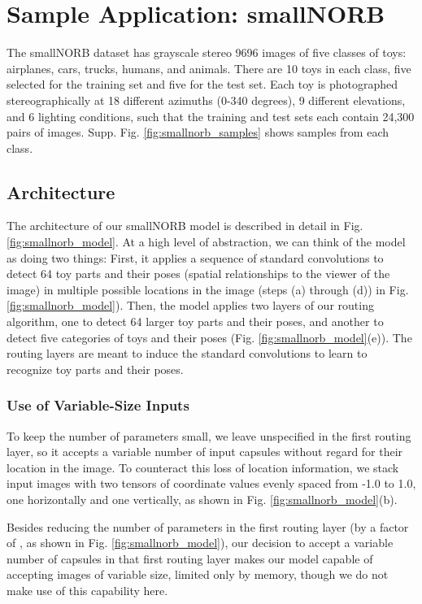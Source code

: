 \documentclass[11pt,a4paper]{article}
\begin{document}
\section{Sample Application: smallNORB}
\label{sec:smallNORB_discussion}

The smallNORB dataset \cite{LeCun:2004:LMG:1896300.1896315} has grayscale stereo 9696 images of five classes of toys: airplanes, cars, trucks, humans, and animals. There are 10 toys in each class, five selected for the training set and five for the test set. Each toy is photographed stereographically at 18 different azimuths (0-340 degrees), 9 different elevations, and 6 lighting conditions, such that the training and test sets each contain 24,300 pairs of images. Supp. Fig. \ref{fig:smallnorb_samples} shows samples from each class.

\subsection{Architecture}

The architecture of our smallNORB model is described in detail in Fig. \ref{fig:smallnorb_model}. At a high level of abstraction, we can think of the model as doing two things: First, it applies a sequence of standard convolutions to detect 64 toy parts and their  poses (spatial relationships to the viewer of the image) in multiple possible locations in the image (steps (a) through (d)) in Fig. \ref{fig:smallnorb_model}). Then, the model applies two layers of our routing algorithm, one to detect 64 larger toy parts and their poses, and another to detect five categories of toys and their poses (Fig. \ref{fig:smallnorb_model}(e)). The routing layers are meant to induce the standard convolutions to learn to recognize toy parts and their poses.

\subsubsection{Use of Variable-Size Inputs}

To keep the number of parameters small, we leave  unspecified in the first routing layer, so it accepts a variable number of input capsules without regard for their location in the image. To counteract this loss of location information, we stack input images with two tensors of coordinate values evenly spaced from -1.0 to 1.0, one horizontally and one vertically, as shown in Fig. \ref{fig:smallnorb_model}(b).

Besides reducing the number of parameters in the first routing layer (by a factor of , as shown in Fig. \ref{fig:smallnorb_model}), our decision to accept a variable number of capsules in that first routing layer makes our model capable of accepting images of variable size, limited only by memory, though we do not make use of this capability here.
\end{document}
